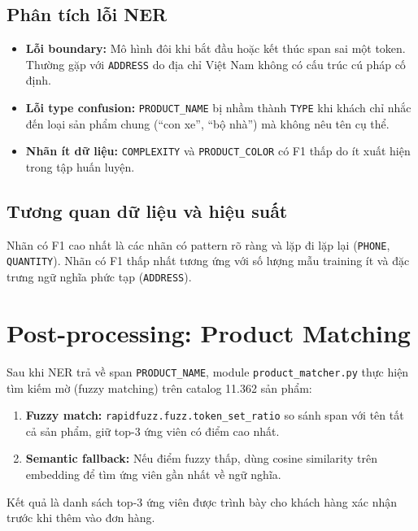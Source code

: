 \documentclass[12pt, a4paper]{report}
\begin{document}
\subsection{Phân tích lỗi NER}

\begin{itemize}
  \item \textbf{Lỗi boundary:} Mô hình đôi khi bắt đầu hoặc kết thúc span
        sai một token. Thường gặp với \texttt{ADDRESS} do địa chỉ Việt Nam
        không có cấu trúc cú pháp cố định.
  \item \textbf{Lỗi type confusion:} \texttt{PRODUCT\_NAME} bị nhầm thành
        \texttt{TYPE} khi khách chỉ nhắc đến loại sản phẩm chung
        (``con xe'', ``bộ nhà'') mà không nêu tên cụ thể.
  \item \textbf{Nhãn ít dữ liệu:} \texttt{COMPLEXITY} và
        \texttt{PRODUCT\_COLOR} có F1 thấp do ít xuất hiện trong
        tập huấn luyện.
\end{itemize}

\subsection{Tương quan dữ liệu và hiệu suất}

Nhãn có F1 cao nhất là các nhãn có pattern rõ ràng và lặp đi lặp lại
(\texttt{PHONE}, \texttt{QUANTITY}). Nhãn có F1 thấp nhất tương ứng với
số lượng mẫu training ít và đặc trưng ngữ nghĩa phức tạp (\texttt{ADDRESS}).

\section{Post-processing: Product Matching}

Sau khi NER trả về span \texttt{PRODUCT\_NAME}, module \texttt{product\_matcher.py}
thực hiện tìm kiếm mờ (fuzzy matching) trên catalog 11.362 sản phẩm:

\begin{enumerate}
  \item \textbf{Fuzzy match:} \texttt{rapidfuzz.fuzz.token\_set\_ratio}
        so sánh span với tên tất cả sản phẩm, giữ top-3 ứng viên có điểm cao nhất.
  \item \textbf{Semantic fallback:} Nếu điểm fuzzy thấp, dùng cosine similarity
        trên embedding để tìm ứng viên gần nhất về ngữ nghĩa.
\end{enumerate}

Kết quả là danh sách top-3 ứng viên được trình bày cho khách hàng xác nhận
trước khi thêm vào đơn hàng.
\end{document}
